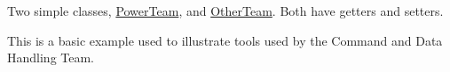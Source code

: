 Two simple classes, \hyperlink{classPowerTeam}{Power\-Team}, and \hyperlink{classOtherTeam}{Other\-Team}. Both have getters and setters.

This is a basic example used to illustrate tools used by the Command and Data Handling Team. 